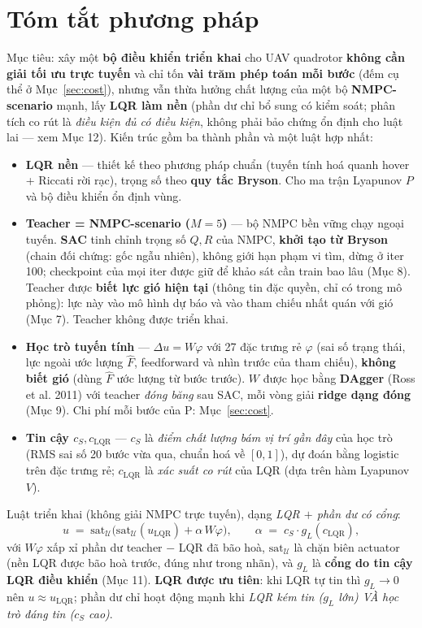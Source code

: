 \documentclass[11pt]{article}
\newcommand{\cS}{c_{S}}
\newcommand{\cL}{c_{\mathrm{LQR}}}
\newcommand{\uL}{u_{\mathrm{LQR}}}
\begin{document}
\section{Tóm tắt phương pháp}
Mục tiêu: xây một \textbf{bộ điều khiển triển khai} cho UAV quadrotor \textbf{không cần giải tối ưu
trực tuyến} và chỉ tốn \textbf{vài trăm phép toán mỗi bước} (đếm cụ thể ở Mục~\ref{sec:cost}), nhưng vẫn thừa hưởng chất lượng của một bộ
\textbf{NMPC-scenario} mạnh, lấy \textbf{LQR làm nền} (phần dư chỉ bổ sung có kiểm soát; phân tích co rút là
\emph{điều kiện đủ có điều kiện}, không phải bảo chứng ổn định cho luật lai --- xem Mục 12). Kiến trúc gồm
ba thành phần và một luật hợp nhất:
\begin{itemize}[leftmargin=1.4em,itemsep=1pt]
\item \textbf{LQR nền} — thiết kế theo phương pháp chuẩn (tuyến tính hoá quanh hover + Riccati rời rạc),
trọng số theo \textbf{quy tắc Bryson}. Cho ma trận Lyapunov $P$ và bộ điều khiển ổn định vùng.
\item \textbf{Teacher = NMPC-scenario ($M{=}5$)} — bộ NMPC bền vững chạy ngoại tuyến. \textbf{SAC} tinh chỉnh
trọng số $Q,R$ của NMPC, \textbf{khởi tạo từ Bryson} (chain đối chứng: gốc ngẫu nhiên), không giới hạn phạm vi
tìm, dừng ở iter 100; checkpoint của mọi iter được giữ để khảo sát cần train bao lâu (Mục 8). Teacher được \textbf{biết lực gió hiện tại} (thông tin
đặc quyền, chỉ có trong mô phỏng): lực này vào mô hình dự báo và vào tham chiếu nhất quán với gió (Mục 7).
Teacher không được triển khai.
\item \textbf{Học trò tuyến tính} — $\Delta u=W\varphi$ với 27 đặc trưng rẻ $\varphi$ (sai số trạng thái, lực ngoài
ước lượng $\hat F$, feedforward và nhìn trước của tham chiếu), \textbf{không biết gió} (dùng $\hat F$ ước lượng
từ bước trước). $W$ được học bằng \textbf{DAgger} (Ross et al. 2011) với teacher \emph{đóng băng} sau SAC,
mỗi vòng giải \textbf{ridge dạng đóng} (Mục 9). Chi phí mỗi bước của P: Mục~\ref{sec:cost}.
\item \textbf{Tin cậy $\cS,\cL$} — $\cS$ là \emph{điểm chất lượng bám vị trí gần đây} của học trò (RMS sai số 20
bước vừa qua, chuẩn hoá về $[0,1]$), dự đoán bằng logistic trên đặc trưng rẻ; $\cL$ là \emph{xác suất co rút}
của LQR (dựa trên hàm Lyapunov $V$).
\end{itemize}
Luật triển khai (không giải NMPC trực tuyến), dạng \emph{LQR $+$ phần dư có cổng}:
\[
u \;=\; \mathrm{sat}_{\mathcal U}\!\big(\mathrm{sat}_{\mathcal U}(\uL) + \alpha\,W\varphi\big), \qquad
\alpha \;=\; \cS\cdot g_L(\cL),
\]
với $W\varphi$ xấp xỉ phần dư teacher $-$ LQR đã bão hoà, $\mathrm{sat}_{\mathcal U}$ là chặn biên actuator (nền
LQR được bão hoà trước, đúng như trong nhãn), và $g_L$ là \textbf{cổng do tin cậy LQR điều khiển} (Mục 11).
\textbf{LQR được ưu tiên}: khi LQR tự tin thì $g_L\to0$ nên $u\approx\uL$; phần dư chỉ hoạt động mạnh khi
\emph{LQR kém tin ($g_L$ lớn) VÀ học trò đáng tin ($\cS$ cao)}.
\end{document}
